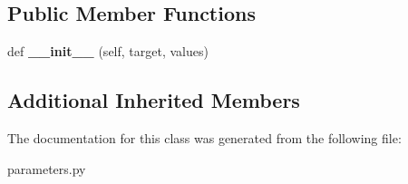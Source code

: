 \subsection*{Public Member Functions}
\begin{DoxyCompactItemize}
\item 
\mbox{\label{classcodar_1_1cheetah_1_1parameters_1_1_param_scheduler_args_abdc6ffa1471d8207fb6de1222791ef87}} 
def {\bfseries \+\_\+\+\_\+init\+\_\+\+\_\+} (self, target, values)
\end{DoxyCompactItemize}
\subsection*{Additional Inherited Members}


The documentation for this class was generated from the following file\+:\begin{DoxyCompactItemize}
\item 
parameters.\+py\end{DoxyCompactItemize}
